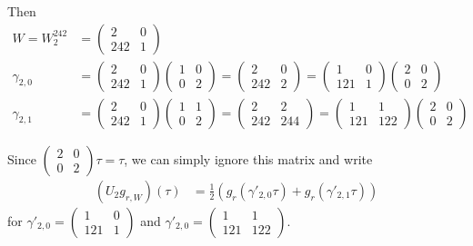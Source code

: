 \documentclass{article}
\begin{document}
Then
\begin{align*}
  W = W_2^{242}
  &=
    \begin{pmatrix}
      2 & 0\\
      242 & 1
    \end{pmatrix}\\
  \gamma_{2,0}
  &=
    \begin{pmatrix}
      2 & 0\\
      242 & 1
    \end{pmatrix}
    \begin{pmatrix}
      1 & 0\\
      0 & 2
    \end{pmatrix}
  =
    \begin{pmatrix}2&0\\242&2\end{pmatrix}
  =
    \begin{pmatrix}1&0\\121&1\end{pmatrix}
    \begin{pmatrix}2&0\\0&2\end{pmatrix}
  \\
  \gamma_{2,1}
  &=
    \begin{pmatrix}
      2 & 0\\
      242 & 1
    \end{pmatrix}
    \begin{pmatrix}
      1 & 1\\
      0 & 2
    \end{pmatrix}
  =
    \begin{pmatrix}2&2\\242&244\end{pmatrix}
  =
    \begin{pmatrix}1&1\\121&122\end{pmatrix}
    \begin{pmatrix}2&0\\0&2\end{pmatrix}
\end{align*}

Since $\left(\begin{smallmatrix}2&0\\0&2\end{smallmatrix}\right)\tau =
\tau$, we can simply ignore this matrix and write
\begin{align*}
  (U_2 g_{r, W})(\tau)
  &=
    \frac{1}{2}\left(g_r(\gamma'_{2,0}\tau) + g_r(\gamma'_{2,1}\tau)\right)
\end{align*}
for
$\gamma'_{2,0} =
\left(\begin{smallmatrix}1&0\\121&1\end{smallmatrix}\right)$ and
$\gamma'_{2,0} =
\left(\begin{smallmatrix}1&1\\121&122\end{smallmatrix}\right)$.
\end{document}
